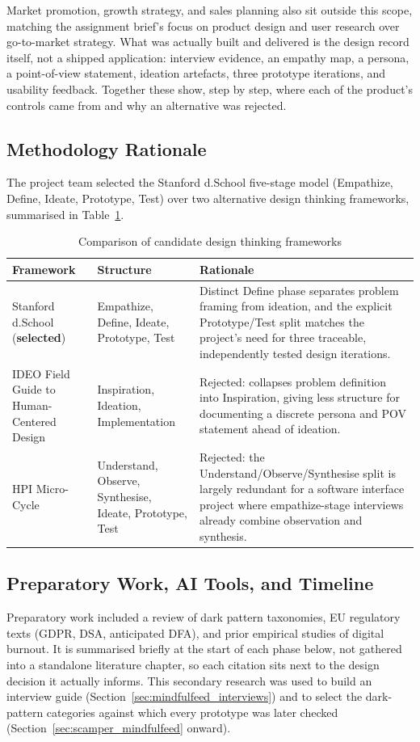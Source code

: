 \documentclass[11pt]{article}
\begin{document}
Market promotion, growth strategy, and sales planning also sit outside this scope, matching the assignment brief's focus on product design and user research over go-to-market strategy. What was actually built and delivered is the design record itself, not a shipped application: interview evidence, an empathy map, a persona, a point-of-view statement, ideation artefacts, three prototype iterations, and usability feedback. Together these show, step by step, where each of the product's controls came from and why an alternative was rejected.

\subsection{Methodology Rationale}
The project team selected the Stanford d.School five-stage model (Empathize, Define, Ideate, Prototype, Test) over two alternative design thinking frameworks, summarised in Table~\ref{tab:framework_comparison}.

\begin{table}[h]
\centering
\caption{Comparison of candidate design thinking frameworks}
\label{tab:framework_comparison}
\small
\begin{tabular}{p{3cm}p{6cm}p{6cm}}
\hline
\textbf{Framework} & \textbf{Structure} & \textbf{Rationale} \\
\hline
Stanford d.School (\textbf{selected}) & Empathize, Define, Ideate, Prototype, Test & Distinct Define phase separates problem framing from ideation, and the explicit Prototype/Test split matches the project's need for three traceable, independently tested design iterations. \\
IDEO Field Guide to Human-Centered Design & Inspiration, Ideation, Implementation & Rejected: collapses problem definition into Inspiration, giving less structure for documenting a discrete persona and POV statement ahead of ideation. \\
HPI Micro-Cycle & Understand, Observe, Synthesise, Ideate, Prototype, Test & Rejected: the Understand/Observe/Synthesise split is largely redundant for a software interface project where empathize-stage interviews already combine observation and synthesis. \\
\hline
\end{tabular}
\end{table}

\subsection{Preparatory Work, AI Tools, and Timeline}
Preparatory work included a review of dark pattern taxonomies, EU regulatory texts (GDPR, DSA, anticipated DFA), and prior empirical studies of digital burnout. It is summarised briefly at the start of each phase below, not gathered into a standalone literature chapter, so each citation sits next to the design decision it actually informs. This secondary research was used to build an interview guide (Section~\ref{sec:mindfulfeed_interviews}) and to select the dark-pattern categories against which every prototype was later checked (Section~\ref{sec:scamper_mindfulfeed} onward).
\end{document}
